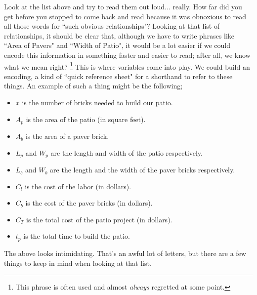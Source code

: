 Look at the list above and try to read them out loud... really. How far did you get before you stopped to come back and read because it was obnoxious to read all those words for ``such obvious relationships"? Looking at that list of relationships, it should be clear that, although we have to write phrases like ``Area of Pavers" and ``Width of Patio", it would be a lot easier if we could encode this information in something faster and easier to read; after all, we know what we mean right?%
\footnote{This phrase is often used and almost \textit{always} regretted at some point.}
This is where variables come into play. We could build an encoding, a kind of ``quick reference sheet" for a shorthand to refer to these things. An example of such a thing might be the following;
\begin{itemize}
\item $x$ is the number of bricks needed to build our patio.
\item $A_p$ is the area of the patio (in square feet).
\item $A_b$ is the area of a paver brick.
\item $L_p$ and $W_p$ are the length and width of the patio respectively.
\item $L_b$ and $W_b$ are the length and the width of the paver bricks respectively.
\item $C_l$ is the cost of the labor (in dollars).
\item $C_b$ is the cost of the paver bricks (in dollars).
\item $C_T$ is the total cost of the patio project (in dollars).
\item $t_p$ is the total time to build the patio.
\end{itemize}
The above looks intimidating. That's an awful lot of letters, but there are a few things to keep in mind when looking at that list. 
